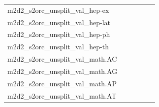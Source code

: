 \documentclass[dvipsnames]{article}
\begin{document}
\begin{appendix}
{\begin{longtable}{m{6cm}m{1.7cm}m{1.7cm}m{1.7cm}m{1.7cm}m{1.7cm}}
	m2d2\_s2orc\_unsplit\_val\_hep-ex  & \colorbox[HTML]{fafdca}{\makebox[\mywidth][c]{10.47}} & \colorbox[HTML]{f7fcbc}{\makebox[\mywidth][c]{10.37}} & \colorbox[HTML]{ffffe5}{\makebox[\mywidth][c]{11.61}} & \colorbox[HTML]{cdeb9d}{\makebox[\mywidth][c]{10.13}} & \colorbox[HTML]{77c578}{\makebox[\mywidth][c]{9.96}}\\
	m2d2\_s2orc\_unsplit\_val\_hep-lat  & \colorbox[HTML]{eaf7af}{\makebox[\mywidth][c]{13.13}} & \colorbox[HTML]{e5f4ab}{\makebox[\mywidth][c]{13.10}} & \colorbox[HTML]{ffffe5}{\makebox[\mywidth][c]{14.57}} & \colorbox[HTML]{d5eea1}{\makebox[\mywidth][c]{13.02}} & \colorbox[HTML]{77c578}{\makebox[\mywidth][c]{12.80}}\\
	m2d2\_s2orc\_unsplit\_val\_hep-ph  & \colorbox[HTML]{d1ec9f}{\makebox[\mywidth][c]{11.67}} & \colorbox[HTML]{e9f6af}{\makebox[\mywidth][c]{11.81}} & \colorbox[HTML]{ffffe5}{\makebox[\mywidth][c]{13.38}} & \colorbox[HTML]{ceeb9e}{\makebox[\mywidth][c]{11.66}} & \colorbox[HTML]{77c578}{\makebox[\mywidth][c]{11.45}}\\
	m2d2\_s2orc\_unsplit\_val\_hep-th  & \colorbox[HTML]{e1f3a9}{\makebox[\mywidth][c]{11.46}} & \colorbox[HTML]{e6f5ad}{\makebox[\mywidth][c]{11.49}} & \colorbox[HTML]{ffffe5}{\makebox[\mywidth][c]{12.71}} & \colorbox[HTML]{cdeb9d}{\makebox[\mywidth][c]{11.40}} & \colorbox[HTML]{77c578}{\makebox[\mywidth][c]{11.24}}\\
	m2d2\_s2orc\_unsplit\_val\_math.AC  & \colorbox[HTML]{77c578}{\makebox[\mywidth][c]{7.08}} & \colorbox[HTML]{e9f6af}{\makebox[\mywidth][c]{7.37}} & \colorbox[HTML]{ffffe5}{\makebox[\mywidth][c]{8.71}} & \colorbox[HTML]{d1ec9f}{\makebox[\mywidth][c]{7.26}} & \colorbox[HTML]{98d485}{\makebox[\mywidth][c]{7.13}}\\
	m2d2\_s2orc\_unsplit\_val\_math.AG  & \colorbox[HTML]{77c578}{\makebox[\mywidth][c]{8.89}} & \colorbox[HTML]{e7f5ad}{\makebox[\mywidth][c]{9.27}} & \colorbox[HTML]{ffffe5}{\makebox[\mywidth][c]{11.05}} & \colorbox[HTML]{d7efa2}{\makebox[\mywidth][c]{9.16}} & \colorbox[HTML]{93d183}{\makebox[\mywidth][c]{8.95}}\\
	m2d2\_s2orc\_unsplit\_val\_math.AP  & \colorbox[HTML]{77c578}{\makebox[\mywidth][c]{9.35}} & \colorbox[HTML]{d4eea0}{\makebox[\mywidth][c]{9.53}} & \colorbox[HTML]{ffffe5}{\makebox[\mywidth][c]{10.90}} & \colorbox[HTML]{a0d789}{\makebox[\mywidth][c]{9.41}} & \colorbox[HTML]{7ac779}{\makebox[\mywidth][c]{9.35}}\\
	m2d2\_s2orc\_unsplit\_val\_math.AT  & \colorbox[HTML]{91d183}{\makebox[\mywidth][c]{8.57}} & \colorbox[HTML]{def2a6}{\makebox[\mywidth][c]{8.77}} & \colorbox[HTML]{ffffe5}{\makebox[\mywidth][c]{10.16}} & \colorbox[HTML]{d3eda0}{\makebox[\mywidth][c]{8.72}} & \colorbox[HTML]{77c578}{\makebox[\mywidth][c]{8.53}}\\

\end{longtable}}
\end{appendix}
\end{document}
